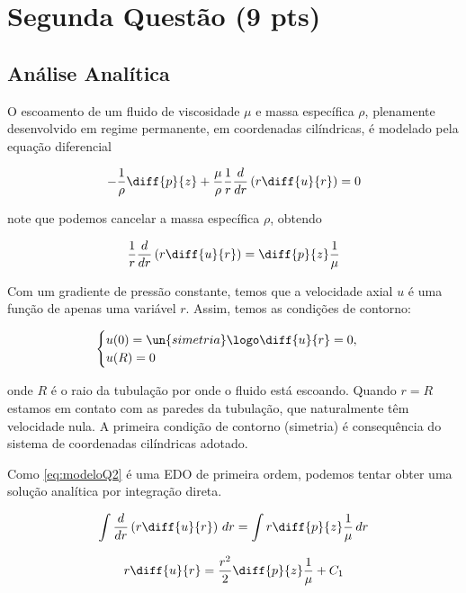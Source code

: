 
\section{Segunda Questão (9 pts)}

\subsection{Análise Analítica}


O escoamento de um fluido de viscosidade $\mu$ e massa específica $\rho$,
plenamente desenvolvido em regime permanente, em coordenadas cilíndricas,
é modelado pela equação diferencial 

\[ -\frac{1}{\rho} \diff{p}{z} + \frac{\mu}{\rho} \frac{1}{r} \frac{d}{dr} \left(r\diff{u}{r}\right) = 0 \]

\noindent note que podemos cancelar a massa específica $\rho$, obtendo

\begin{equation}\label{eq:modeloQ2}
    \frac{1}{r} \frac{d}{dr} \left(r\diff{u}{r}\right) = \diff{p}{z} \frac{1}{\mu}
\end{equation}

Com um gradiente de pressão constante, temos que a velocidade axial $u$ 
é uma função de apenas uma variável $r$. Assim, temos as condições de contorno:

\begin{equation}\label{eq:modeloQ2Contorno}
    \begin{cases}
        u(0) = \un{simetria} \logo \diff{u}{r} = 0,\\
        u(R) = 0 \\
    \end{cases}
\end{equation}

\noindent onde $R$ é o raio da tubulação por onde o fluido está escoando. Quando 
$r = R$ estamos em contato com as paredes da tubulação, que naturalmente têm 
velocidade nula. A primeira condição de contorno (simetria) é consequência do sistema de coordenadas
cilíndricas adotado.

Como \eqref{eq:modeloQ2} é uma EDO de primeira ordem, podemos tentar obter uma solução 
analítica por integração direta. 

\[ \int \frac{d}{dr} \left(r\diff{u}{r}\right) \, dr = \int r \diff{p}{z} \frac{1}{\mu} \, dr \]

\[ r \diff{u}{r} = \frac{r^2}{2} \diff{p}{z} \frac{1}{\mu} + C_1 \]

